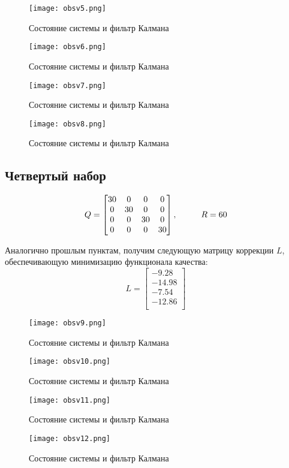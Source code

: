 \begin{figure}[ht]
  \centering
  \texttt{[image: obsv5.png]}
  \caption{Состояние системы и фильтр Калмана}
\end{figure}
\newpage
\begin{figure}[ht]
  \centering
  \texttt{[image: obsv6.png]}
  \caption{Состояние системы и фильтр Калмана}
\end{figure}
\begin{figure}[ht]
  \centering
  \texttt{[image: obsv7.png]}
  \caption{Состояние системы и фильтр Калмана}
\end{figure}
\newpage
\begin{figure}[ht]
  \centering
  \texttt{[image: obsv8.png]}
  \caption{Состояние системы и фильтр Калмана}
\end{figure}

\subsection{Четвертый набор}
$$
  Q = \begin{bmatrix}
                      30 & 0 & 0 & 0\\
                      0 & 30 & 0 & 0\\
                      0 & 0 & 30 & 0\\
                      0 & 0 & 0 & 30
                      \end{bmatrix}, \hspace*{1cm} R=60
$$

Аналогично прошлым пунктам, получим следующую матрицу коррекции $L$, обеспечивающую минимизацию функционала качества:
$$
   L = \begin{bmatrix}
    -9.28 \\
    -14.98 \\
    -7.54 \\
    -12.86 \\
\end{bmatrix}
$$

\begin{figure}[ht]
  \centering
  \texttt{[image: obsv9.png]}
  \caption{Состояние системы и фильтр Калмана}
\end{figure}
\newpage
\begin{figure}[ht]
  \centering
  \texttt{[image: obsv10.png]}
  \caption{Состояние системы и фильтр Калмана}
\end{figure}
\begin{figure}[ht]
  \centering
  \texttt{[image: obsv11.png]}
  \caption{Состояние системы и фильтр Калмана}
\end{figure}
\newpage
\begin{figure}[ht]
  \centering
  \texttt{[image: obsv12.png]}
  \caption{Состояние системы и фильтр Калмана}
\end{figure}

